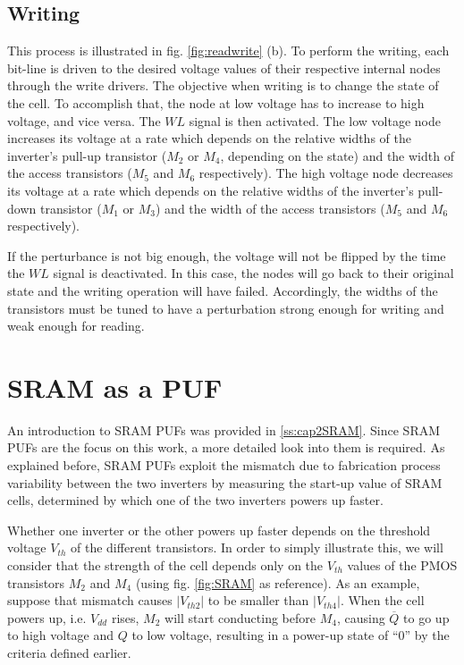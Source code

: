 \subsection*{Writing}

This process is illustrated in fig. \ref{fig:readwrite} (b). To perform the writing, each bit-line is driven to the desired voltage values of their respective internal nodes through the write drivers. The objective when writing is to change the state of the cell. To accomplish that, the node at low voltage has to increase to high voltage, and vice versa. The $WL$ signal is then activated. The low voltage node increases its voltage at a rate which depends on the relative widths of the inverter's pull-up transistor ($M_2$ or $M_4$, depending on the state) and the width of the access transistors ($M_5$ and $M_6$ respectively). The high voltage node decreases its voltage at a rate which depends on the relative widths of the inverter's pull-down transistor ($M_1$ or $M_3$) and the width of the access transistors ($M_5$ and $M_6$ respectively). 

If the perturbance is not big enough, the voltage will not be flipped by the time the $WL$ signal is deactivated. In this case, the nodes will go back to their original state and the writing operation will have failed. Accordingly, the widths of the transistors must be tuned to have a perturbation strong enough for writing and weak enough for reading. 




\section{SRAM as a PUF}

An introduction to SRAM PUFs was provided in \ref{ss:cap2SRAM}. Since SRAM PUFs are the focus on this work, a more detailed look into them is required. As explained before, SRAM PUFs exploit the mismatch due to fabrication process variability between the two inverters by measuring the start-up value of SRAM cells, determined by which one of the two inverters powers up faster. 

Whether one inverter or the other powers up faster depends on the threshold voltage $V_{th}$ of the different transistors. In order to simply illustrate this, we will consider that the strength of the cell depends only on the $V_{th}$ values of the PMOS transistors $M_2$ and $M_4$ (using fig. \ref{fig:SRAM} as reference). As an example, suppose that mismatch causes $|V_{th2}|$ to be smaller than $|V_{th4}|$. When the cell powers up, i.e. $V_{dd}$ rises, $M_2$ will start conducting before $M_4$, causing $\overline{Q}$ to go up to high voltage and $Q$ to low voltage, resulting in a power-up state of ``0'' by the criteria defined earlier.   

